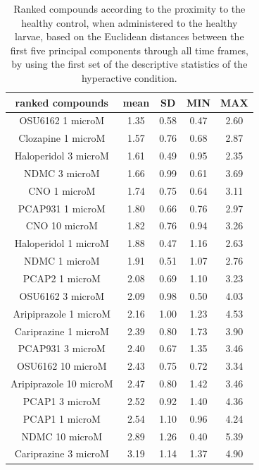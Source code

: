 \documentclass[a4paper,12pt]{article}
\begin{document}
\begin{table}[h!]\tiny
\centering
\caption{Ranked compounds according to the proximity to the healthy control, when administered to the healthy larvae, based on the Euclidean distances between the first five principal components through all time frames, by using the first set of the descriptive statistics of the hyperactive condition.}
\begin{tabular}{|c|c|c|c|c|}
\hline
ranked compounds             & mean & SD   & MIN  & MAX   \\ \hline
OSU6162 1 microM       & 1.35 & 0.58 & 0.47 & 2.60   \\ \hline
Clozapine 1 microM     & 1.57 & 0.76 & 0.68 & 2.87  \\ \hline
Haloperidol 3 microM   & 1.61 & 0.49 & 0.95 & 2.35  \\ \hline
NDMC 3 microM          & 1.66 & 0.99 & 0.61 & 3.69  \\ \hline
CNO 1 microM           & 1.74 & 0.75 & 0.64 & 3.11  \\ \hline
PCAP931 1 microM       & 1.80  & 0.66 & 0.76 & 2.97  \\ \hline
CNO 10 microM          & 1.82 & 0.76 & 0.94 & 3.26  \\ \hline
Haloperidol 1 microM   & 1.88 & 0.47 & 1.16 & 2.63  \\ \hline
NDMC 1 microM          & 1.91 & 0.51 & 1.07 & 2.76  \\ \hline
PCAP2 1 microM         & 2.08 & 0.69 & 1.10  & 3.23  \\ \hline
OSU6162 3 microM       & 2.09 & 0.98 & 0.50  & 4.03  \\ \hline
Aripiprazole 1 microM  & 2.16 & 1.00    & 1.23 & 4.53  \\ \hline
Cariprazine 1 microM   & 2.39 & 0.80  & 1.73 & 3.90   \\ \hline
PCAP931 3 microM       & 2.40  & 0.67 & 1.35 & 3.46  \\ \hline
OSU6162 10 microM      & 2.43 & 0.75 & 0.72 & 3.34  \\ \hline
Aripiprazole 10 microM & 2.47 & 0.80  & 1.42 & 3.46  \\ \hline
PCAP1 3 microM         & 2.52 & 0.92 & 1.40  & 4.36  \\ \hline
PCAP1 1 microM         & 2.54 & 1.10  & 0.96 & 4.24  \\ \hline
NDMC 10 microM         & 2.89 & 1.26 & 0.40  & 5.39  \\ \hline
Cariprazine 3 microM   & 3.19 & 1.14 & 1.37 & 4.90   \\ \hline

\end{tabular}
\end{table}
\end{document}
